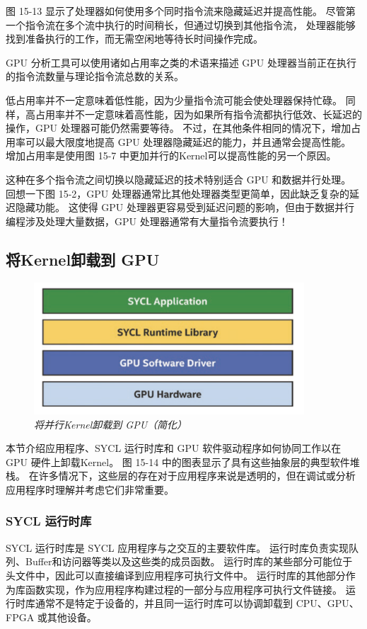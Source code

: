 图 15-13 显示了处理器如何使用多个同时指令流来隐藏延迟并提高性能。 
尽管第一个指令流在多个流中执行的时间稍长，但通过切换到其他指令流，
处理器能够找到准备执行的工作，而无需空闲地等待长时间操作完成。

GPU 分析工具可以使用诸如占用率之类的术语来描述 GPU 处理器当前正在执行的指令流数量与理论指令流总数的关系。

低占用率并不一定意味着低性能，因为少量指令流可能会使处理器保持忙碌。 
同样，高占用率并不一定意味着高性能，因为如果所有指令流都执行低效、长延迟的操作，GPU 处理器可能仍然需要等待。 
不过，在其他条件相同的情况下，增加占用率可以最大限度地提高 GPU 处理器隐藏延迟的能力，并且通常会提高性能。 
增加占用率是使用图 15-7 中更加并行的Kernel可以提高性能的另一个原因。

这种在多个指令流之间切换以隐藏延迟的技术特别适合 GPU 和数据并行处理。 
回想一下图 15-2，GPU 处理器通常比其他处理器类型更简单，因此缺乏复杂的延迟隐藏功能。 
这使得 GPU 处理器更容易受到延迟问题的影响，但由于数据并行编程涉及处理大量数据，GPU 处理器通常有大量指令流要执行！

\subsection{将Kernel卸载到 GPU}
\begin{figure}[H]
	\centering
	\includegraphics[width=0.9\textwidth]{figs/F15.14.png}
	\caption{\textit{将并行Kernel卸载到 GPU（简化）}}
\end{figure}

本节介绍应用程序、SYCL 运行时库和 GPU 软件驱动程序如何协同工作以在 GPU 硬件上卸载Kernel。 
图 15-14 中的图表显示了具有这些抽象层的典型软件堆栈。 
在许多情况下，这些层的存在对于应用程序来说是透明的，但在调试或分析应用程序时理解并考虑它们非常重要。

\subsubsection{SYCL 运行时库}
SYCL 运行时库是 SYCL 应用程序与之交互的主要软件库。 
运行时库负责实现队列、Buffer和访问器等类以及这些类的成员函数。 
运行时库的某些部分可能位于头文件中，因此可以直接编译到应用程序可执行文件中。 
运行时库的其他部分作为库函数实现，作为应用程序构建过程的一部分与应用程序可执行文件链接。 
运行时库通常不是特定于设备的，并且同一运行时库可以协调卸载到 CPU、GPU、FPGA 或其他设备。

